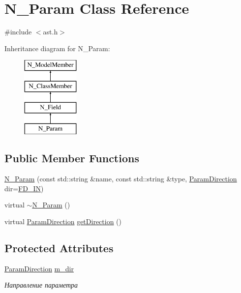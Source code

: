 \hypertarget{classN__Param}{}\section{N\+\_\+\+Param Class Reference}
\label{classN__Param}


{\ttfamily \#include $<$ast.\+h$>$}

Inheritance diagram for N\+\_\+\+Param\+:\begin{figure}[H]
\begin{center}
\leavevmode
\includegraphics[height=4.000000cm]{classN__Param}
\end{center}
\end{figure}
\subsection*{Public Member Functions}
\begin{DoxyCompactItemize}
\item 
\hyperlink{classN__Param_a139b2cfde8b6ee552a3d745923385e8a}{N\+\_\+\+Param} (const std\+::string \&name, const std\+::string \&type, \hyperlink{ast_8h_af1bb1892f9e576501ff47410367569a7}{Param\+Direction} dir=\hyperlink{ast_8h_af1bb1892f9e576501ff47410367569a7afee394973f2e8a09ef035ae90b3eadb8}{F\+D\+\_\+\+I\+N})
\item 
virtual \hyperlink{classN__Param_a6210fdea783f436c304f238a011147b8}{$\sim$\+N\+\_\+\+Param} ()
\item 
virtual \hyperlink{ast_8h_af1bb1892f9e576501ff47410367569a7}{Param\+Direction} \hyperlink{classN__Param_a7bb8f5849bebadae38ea4972fdc57dc8}{get\+Direction} ()
\end{DoxyCompactItemize}
\subsection*{Protected Attributes}
\begin{DoxyCompactItemize}
\item 
\hyperlink{ast_8h_af1bb1892f9e576501ff47410367569a7}{Param\+Direction} \hyperlink{classN__Param_a72e88bb3b11584177bae2b66e009f9fb}{m\+\_\+dir}
\begin{DoxyCompactList}\small\item\em Направление параметра \end{DoxyCompactList}\end{DoxyCompactItemize}

